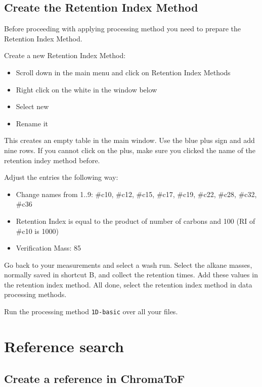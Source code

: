 \documentclass[]{book}
\providecommand{\tightlist}{%
  \setlength{\itemsep}{0pt}\setlength{\parskip}{0pt}}
\theoremstyle{definition}
\theoremstyle{definition}
\theoremstyle{definition}
\theoremstyle{remark}
\begin{document}
\subsection{Create the Retention Index Method}\label{createri}

Before proceeding with applying processing method you need to prepare
the Retention Index Method.

Create a new Retention Index Method:

\begin{itemize}
\tightlist
\item
  Scroll down in the main menu and click on Retention Index Methods
\item
  Right click on the white in the window below
\item
  Select new
\item
  Rename it
\end{itemize}

This creates an empty table in the main window. Use the blue plus sign
and add nine rows. If you cannot click on the plus, make sure you
clicked the name of the retention indey method before.

Adjust the entries the following way:

\begin{itemize}
\tightlist
\item
  Change names from 1..9: \#c10, \#c12, \#c15, \#c17, \#c19, \#c22,
  \#c28, \#c32, \#c36
\item
  Retention Index is equal to the product of number of carbons and 100
  (RI of \#c10 is 1000)
\item
  Verification Mass: 85
\end{itemize}

Go back to your measurements and select a wash run. Select the alkane
masses, normally saved in shortcut B, and collect the retention times.
Add these values in the retention index method. All done, select the
retention index method in data processing methods.

Run the processing method \texttt{1D-basic} over all your files.

\section{Reference search}\label{reference-search}

\subsection{Create a reference in
ChromaToF}\label{create-a-reference-in-chromatof}
\end{document}

